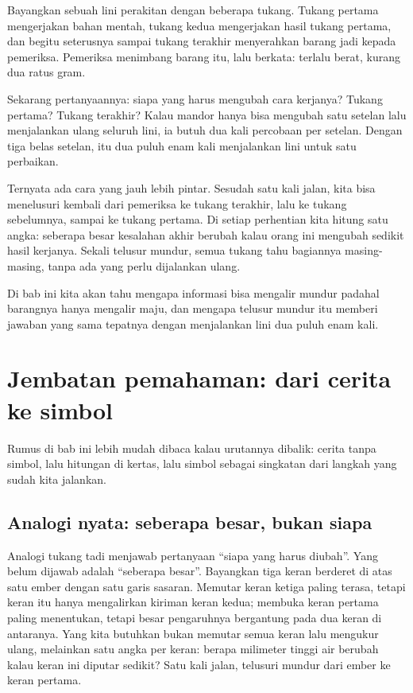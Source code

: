 \begin{untukanak}
Bayangkan sebuah lini perakitan dengan beberapa tukang. Tukang pertama mengerjakan bahan
mentah, tukang kedua mengerjakan hasil tukang pertama, dan begitu seterusnya sampai tukang
terakhir menyerahkan barang jadi kepada pemeriksa. Pemeriksa menimbang barang itu, lalu
berkata: terlalu berat, kurang dua ratus gram.

Sekarang pertanyaannya: siapa yang harus mengubah cara kerjanya? Tukang pertama? Tukang
terakhir? Kalau mandor hanya bisa mengubah satu setelan lalu menjalankan ulang seluruh lini, ia butuh dua kali percobaan per setelan. Dengan tiga belas setelan, itu dua puluh enam kali menjalankan lini untuk satu perbaikan.

Ternyata ada cara yang jauh lebih pintar. Sesudah satu kali jalan, kita bisa menelusuri
kembali dari pemeriksa ke tukang terakhir, lalu ke tukang sebelumnya, sampai ke tukang
pertama. Di setiap perhentian kita hitung satu angka: seberapa besar kesalahan akhir berubah
kalau orang ini mengubah sedikit hasil kerjanya. Sekali telusur mundur, semua tukang tahu
bagiannya masing-masing, tanpa ada yang perlu dijalankan ulang.

Di bab ini kita akan tahu mengapa informasi bisa mengalir mundur padahal barangnya hanya
mengalir maju, dan mengapa telusur mundur itu memberi jawaban yang sama tepatnya dengan
menjalankan lini dua puluh enam kali.
\end{untukanak}

\section{Jembatan pemahaman: dari cerita ke simbol}

Rumus di bab ini lebih mudah dibaca kalau urutannya dibalik: cerita tanpa simbol, lalu
hitungan di kertas, lalu simbol sebagai singkatan dari langkah yang sudah kita jalankan.

\subsection{Analogi nyata: seberapa besar, bukan siapa}

Analogi tukang tadi menjawab pertanyaan ``siapa yang harus diubah''. Yang belum dijawab
adalah ``seberapa besar''. Bayangkan tiga keran berderet di atas satu ember dengan satu
garis sasaran. Memutar keran ketiga paling terasa, tetapi keran itu hanya mengalirkan
kiriman keran kedua; membuka keran pertama paling menentukan, tetapi besar pengaruhnya
bergantung pada dua keran di antaranya. Yang kita butuhkan bukan memutar semua keran lalu
mengukur ulang, melainkan satu angka per keran: berapa milimeter tinggi air berubah kalau
keran ini diputar sedikit? Satu kali jalan, telusuri mundur dari ember ke keran pertama.

